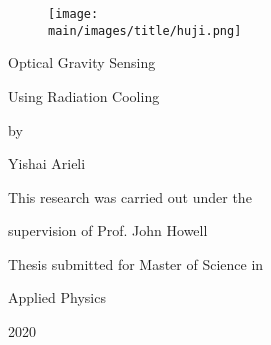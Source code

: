 \documentclass[\main/master.tex]{subfiles}
\begin{document}
\pagestyle{empty}
\begin{titlepage}
\begin{figure}[htbp]
	\centering
	\texttt{[image: \\main/images/title/huji.png]}
\end{figure}
\doublespacing
\begin{center}
  {\titlefont Optical Gravity Sensing \par \vspace{10 mm}
   Using Radiation Cooling
   }
   \vspace{1in}
   
   by\par
   
   Yishai Arieli\par
   This research was carried out under the\par
   supervision of Prof. John Howell\par
   \vspace{1.5in}
   
   Thesis submitted for Master of Science in\par
   Applied Physics\par
   2020
   \end{center}
  \end{titlepage}
\end{document}
